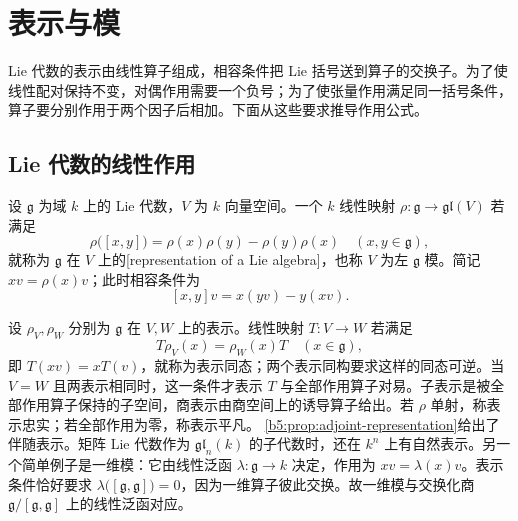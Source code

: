 
\section{表示与模}
\label{b5:sec:1103}


%
%

Lie 代数的表示由线性算子组成，相容条件把 Lie 括号送到算子的交换子。为了使线性配对保持不变，对偶作用需要一个负号；为了使张量作用满足同一括号条件，算子要分别作用于两个因子后相加。下面从这些要求推导作用公式。

\subsection{Lie 代数的线性作用}
\label{b5:subsec:1103:01}

\begin{definition}\label{b5:def:lie-representation}
	设 \(\mathfrak g\) 为域 \(k\) 上的 Lie 代数，\(V\) 为 \(k\) 向量空间。一个 \(k\) 线性映射 \(\rho:\mathfrak g\to\mathfrak{gl}(V)\) 若满足
	\[
		\rho\bigl([x,y]\bigr)=\rho(x)\rho(y)-\rho(y)\rho(x) \quad(x,y\in\mathfrak g),
	\]
	就称为 \(\mathfrak g\) 在 \(V\) 上的[representation of a Lie algebra]，也称 \(V\) 为左 \(\mathfrak g\) 模。简记 \(xv=\rho(x)v\)；此时相容条件为
	\[
		[x,y]v=x(yv)-y(xv).
	\]
\end{definition}
设 \(\rho_V,\rho_W\) 分别为 \(\mathfrak g\) 在 \(V,W\) 上的表示。线性映射 \(T:V\to W\) 若满足
\[
	T\rho_V(x)=\rho_W(x)T\quad(x\in\mathfrak g),
\]
即 \(T(xv)=xT(v)\)，就称为表示同态；两个表示同构要求这样的同态可逆。当 \(V=W\) 且两表示相同时，这一条件才表示 \(T\) 与全部作用算子对易。子表示是被全部作用算子保持的子空间，商表示由商空间上的诱导算子给出。若 \(\rho\) 单射，称表示忠实；若全部作用为零，称表示平凡。
\ProseParagraphBreak
\cref{b5:prop:adjoint-representation}给出了伴随表示。矩阵 Lie 代数作为 \(\mathfrak{gl}_n(k)\) 的子代数时，还在 \(k^n\) 上有自然表示。另一个简单例子是一维模：它由线性泛函 \(\lambda:\mathfrak g\to k\) 决定，作用为 \(xv=\lambda(x)v\)。表示条件恰好要求 \(\lambda\bigl([\mathfrak g,\mathfrak g]\bigr)=0\)，因为一维算子彼此交换。故一维模与交换化商 \(\mathfrak g/[\mathfrak g,\mathfrak g]\) 上的线性泛函对应。

